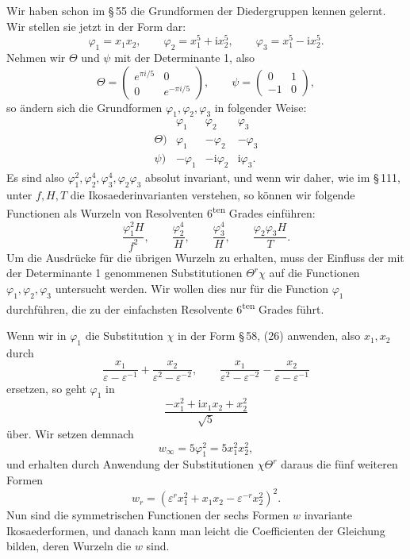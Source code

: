 \documentclass[11pt]{article}
\providecommand{\eps}{\varepsilon}
\providecommand{\ii}{\mathrm{i}}
\providecommand{\eps}{\varepsilon}
\begin{document}
Wir haben schon im \S\,55 die Grundformen der Diedergruppen kennen gelernt. Wir stellen sie jetzt in der Form dar:
\[
\varphi_1=x_1x_2,
\qquad
\varphi_2=x_1^5+\ii x_2^5,
\qquad
\varphi_3=x_1^5-\ii x_2^5.
\]
Nehmen wir \(\Theta\) und \(\psi\) mit der Determinante 1, also
\[
\Theta=\begin{pmatrix}e^{\pi i/5}&0\\0&e^{-\pi i/5}\end{pmatrix},
\qquad
\psi=\begin{pmatrix}0&1\\-1&0\end{pmatrix},
\]
so ändern sich die Grundformen \(\varphi_1,\varphi_2,\varphi_3\) in folgender Weise:
\[
\begin{array}{c|ccc}
&\varphi_1&\varphi_2&\varphi_3\\\hline
\Theta)&\varphi_1&-\varphi_2&-\varphi_3\\
\psi)&-\varphi_1&-\ii\varphi_2&\ii\varphi_3.
\end{array}
\]
Es sind also \(\varphi_1^2,\varphi_2^4,\varphi_3^4,\varphi_2\varphi_3\) absolut invariant, und wenn wir daher, wie im \S\,111, unter \(f,H,T\) die Ikosaederinvarianten verstehen, so können wir folgende Functionen als Wurzeln von Resolventen 6\textsuperscript{ten} Grades einführen:
\[
\frac{\varphi_1^2H}{f^2},
\qquad
\frac{\varphi_2^4}{H},
\qquad
\frac{\varphi_3^4}{H},
\qquad
\frac{\varphi_2\varphi_3H}{T}.
\]
Um die Ausdrücke für die übrigen Wurzeln zu erhalten, muss der Einfluss der mit der Determinante 1 genommenen Substitutionen \(\Theta^r\chi\) auf die Functionen \(\varphi_1,\varphi_2,\varphi_3\) untersucht werden. Wir wollen dies nur für die Function \(\varphi_1\) durchführen, die zu der einfachsten Resolvente 6\textsuperscript{ten} Grades führt.

Wenn wir in \(\varphi_1\) die Substitution \(\chi\) in der Form \S\,58, (26) anwenden, also \(x_1,x_2\) durch
\[
\frac{x_1}{\eps-\eps^{-1}}+\frac{x_2}{\eps^2-\eps^{-2}},
\qquad
\frac{x_1}{\eps^2-\eps^{-2}}-\frac{x_2}{\eps-\eps^{-1}}
\]
ersetzen, so geht \(\varphi_1\) in
\[
\frac{-x_1^2+\ii x_1x_2+x_2^2}{\sqrt5}
\]
über. Wir setzen demnach
\begin{equation}
w_\infty=5\varphi_1^2=5x_1^2x_2^2,
\tag{3}
\end{equation}
und erhalten durch Anwendung der Substitutionen \(\chi\Theta^r\) daraus die fünf weiteren Formen
\begin{equation}
w_r=(\eps^r x_1^2+x_1x_2-\eps^{-r}x_2^2)^2.
\tag{4}
\end{equation}
Nun sind die symmetrischen Functionen der sechs Formen \(w\) invariante Ikosaederformen, und danach kann man leicht die Coefficienten der Gleichung bilden, deren Wurzeln die \(w\) sind.
\end{document}
